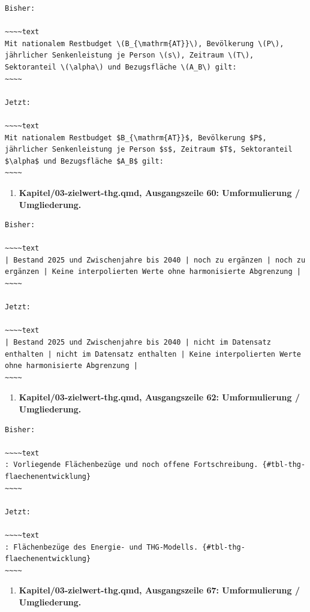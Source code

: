 \documentclass[
  ngerman,
  a4paper,
  DIV=11]{scrreprt}
\providecommand{\tightlist}{%
  \setlength{\itemsep}{0pt}\setlength{\parskip}{0pt}}
\begin{document}
\begin{verbatim}
Bisher:

~~~~text
Mit nationalem Restbudget \(B_{\mathrm{AT}}\), Bevölkerung \(P\), jährlicher Senkenleistung je Person \(s\), Zeitraum \(T\), Sektoranteil \(\alpha\) und Bezugsfläche \(A_B\) gilt:
~~~~

Jetzt:

~~~~text
Mit nationalem Restbudget $B_{\mathrm{AT}}$, Bevölkerung $P$, jährlicher Senkenleistung je Person $s$, Zeitraum $T$, Sektoranteil $\alpha$ und Bezugsfläche $A_B$ gilt:
~~~~
\end{verbatim}

\begin{enumerate}
\def\labelenumi{\arabic{enumi}.}
\setcounter{enumi}{100}
\tightlist
\item
  \textbf{Kapitel/03-zielwert-thg.qmd, Ausgangszeile 60: Umformulierung
  / Umgliederung.}
\end{enumerate}

\begin{verbatim}
Bisher:

~~~~text
| Bestand 2025 und Zwischenjahre bis 2040 | noch zu ergänzen | noch zu ergänzen | Keine interpolierten Werte ohne harmonisierte Abgrenzung |
~~~~

Jetzt:

~~~~text
| Bestand 2025 und Zwischenjahre bis 2040 | nicht im Datensatz enthalten | nicht im Datensatz enthalten | Keine interpolierten Werte ohne harmonisierte Abgrenzung |
~~~~
\end{verbatim}

\begin{enumerate}
\def\labelenumi{\arabic{enumi}.}
\setcounter{enumi}{101}
\tightlist
\item
  \textbf{Kapitel/03-zielwert-thg.qmd, Ausgangszeile 62: Umformulierung
  / Umgliederung.}
\end{enumerate}

\begin{verbatim}
Bisher:

~~~~text
: Vorliegende Flächenbezüge und noch offene Fortschreibung. {#tbl-thg-flaechenentwicklung}
~~~~

Jetzt:

~~~~text
: Flächenbezüge des Energie- und THG-Modells. {#tbl-thg-flaechenentwicklung}
~~~~
\end{verbatim}

\begin{enumerate}
\def\labelenumi{\arabic{enumi}.}
\setcounter{enumi}{102}
\tightlist
\item
  \textbf{Kapitel/03-zielwert-thg.qmd, Ausgangszeile 67: Umformulierung
  / Umgliederung.}
\end{enumerate}
\end{document}
